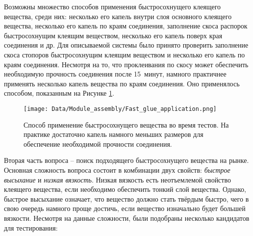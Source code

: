Возможны множество способов применения быстросохнущего клеящего вещества, среди них: несколько его капель внутри слоя основного клеящего вещества, несколько его капель по краям соединения, заполнение скоса распорок быстросохнущим клеящим веществом, несколько его капель поверх края соединения и др. Для описываемой системы было принято проверить заполнение скоса стопоров быстросохнущим клеящим веществом и несколько его капель по краям соединения. Несмотря на то, что проклеивания по скосу может обеспечить необходимую прочность соединения после 15~минут, намного практичнее применять несколько капель вещества по краям соединения. Оно применялось способом, показанным на Рисунке \ref{fig:glue_application}.

\begin{figure}[ht]\centering
\texttt{[image: Data/Module\_assembly/Fast\_glue\_application.png]}
\caption{Способ применение быстросохнущего вещества во время тестов. На практике достаточно капель намного меньших размеров для обеспечение необходимой прочности соединения.}
\label{fig:glue_application}
\end{figure}

Вторая часть вопроса -- поиск подходящего быстросохнущего вещества на рынке. Основная сложность вопроса состоит в комбинации двух свойств: \emph{быстрое высыхание} и \emph{низкая вязкость}. Низкая вязкость есть неотъемлемой свойство клеящего вещества, если необходимо обеспечить тонкий слой вещества. Однако, быстрое высыхание означает, что вещество должно стать твёрдым быстро, чего в свою очередь намного проще достичь, если вещество изначально будет большей вязкости. Несмотря на данные сложности, были подобраны несколько кандидатов для тестирования:

